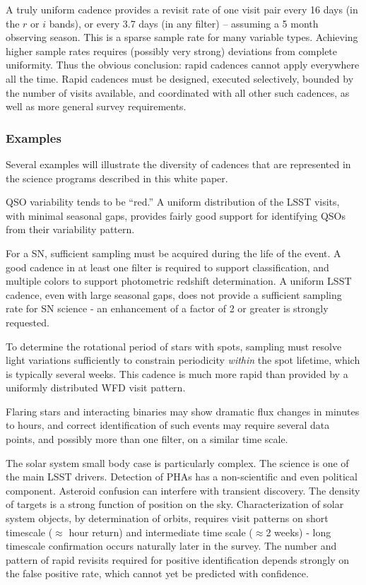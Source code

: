 A truly uniform cadence provides a revisit rate of one visit pair every
16 days (in the $r$ or $i$ bands), or every 3.7 days (in any filter) --
assuming a 5 month observing season.  This is a sparse sample rate for
many variable types.  Achieving higher sample rates requires (possibly
very strong) deviations from complete uniformity.  Thus the obvious
conclusion: rapid cadences cannot apply everywhere all the time. Rapid
cadences must be designed, executed selectively, bounded by the number
of visits available, and coordinated with all other such cadences, as
well as more general survey requirements.

\subsubsection{Examples}

Several examples will illustrate the diversity of cadences that are
represented in the science programs described in this white paper.

QSO variability tends to be ``red.''   A uniform distribution of the
LSST visits, with minimal seasonal gaps, provides fairly good support
for identifying QSOs from their variability pattern.

For a SN, sufficient sampling must be acquired during the life of the
event. A good cadence in at least one filter is required to support
classification, and multiple colors to support photometric redshift
determination.  A uniform LSST cadence, even with large seasonal gaps,
does not provide a sufficient sampling rate for SN science - an
enhancement of a factor of 2 or greater is strongly requested.

To determine the rotational period of stars with spots, sampling must
resolve light variations sufficiently to constrain periodicity {\it
within} the spot lifetime, which is typically several weeks. This
cadence is much more rapid than provided by a uniformly distributed WFD
visit pattern.

Flaring stars and interacting binaries may show dramatic flux changes
in minutes to hours, and correct identification of such events may
require several data points, and possibly more than one filter, on a
similar time scale.

The solar system small body case is particularly complex.  The science
is one of the main LSST drivers.  Detection of PHAs has a non-scientific
and even political component. Asteroid confusion can interfere with
transient discovery. The density of targets is a strong function of
position on the sky.  Characterization of solar system objects, by
determination of orbits, requires visit patterns on short timescale
($\approx$ hour return) and intermediate time scale ($\approx$2 weeks) -
long timescale confirmation occurs naturally later in the survey.  The
number and pattern of rapid revisits required for positive
identification depends strongly on the false positive rate, which cannot
yet be predicted with confidence.



